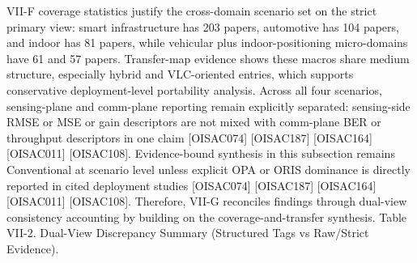{}\markdownRendererInterblockSeparator
{}\markdownRendererUlBeginTight
\markdownRendererUlItem VII-F coverage statistics justify the cross-domain scenario set on the strict primary view: smart infrastructure has 203 papers, automotive has 104 papers, and indoor has 81 papers, while vehicular plus indoor-positioning micro-domains have 61 and 57 papers.\markdownRendererUlItemEnd 
\markdownRendererUlItem Transfer-map evidence shows these macros share medium structure, especially hybrid and VLC-oriented entries, which supports conservative deployment-level portability analysis.\markdownRendererUlItemEnd 
\markdownRendererUlItem Across all four scenarios, sensing-plane and comm-plane reporting remain explicitly separated: sensing-side RMSE or MSE or gain descriptors are not mixed with comm-plane BER or throughput descriptors in one claim [O\markdownRendererUnderscore{}ISAC\markdownRendererUnderscore{}074] [O\markdownRendererUnderscore{}ISAC\markdownRendererUnderscore{}187] [O\markdownRendererUnderscore{}ISAC\markdownRendererUnderscore{}164] [O\markdownRendererUnderscore{}ISAC\markdownRendererUnderscore{}011] [O\markdownRendererUnderscore{}ISAC\markdownRendererUnderscore{}108].\markdownRendererUlItemEnd 
\markdownRendererUlItem Evidence-bound synthesis in this subsection remains Conventional at scenario level unless explicit OPA or ORIS dominance is directly reported in cited deployment studies [O\markdownRendererUnderscore{}ISAC\markdownRendererUnderscore{}074] [O\markdownRendererUnderscore{}ISAC\markdownRendererUnderscore{}187] [O\markdownRendererUnderscore{}ISAC\markdownRendererUnderscore{}164] [O\markdownRendererUnderscore{}ISAC\markdownRendererUnderscore{}011] [O\markdownRendererUnderscore{}ISAC\markdownRendererUnderscore{}108].\markdownRendererUlItemEnd 
\markdownRendererUlEndTight \markdownRendererInterblockSeparator
{}Therefore, VII-G reconciles findings through dual-view consistency accounting by building on the coverage-and-transfer synthesis.\markdownRendererInterblockSeparator
{}
\markdownRendererSectionEnd 
\markdownRendererSectionEnd \markdownRendererSectionBegin
{}\markdownRendererInterblockSeparator
{}Table VII-2. Dual-View Discrepancy Summary (Structured Tags vs Raw/Strict Evidence).\markdownRendererInterblockSeparator
